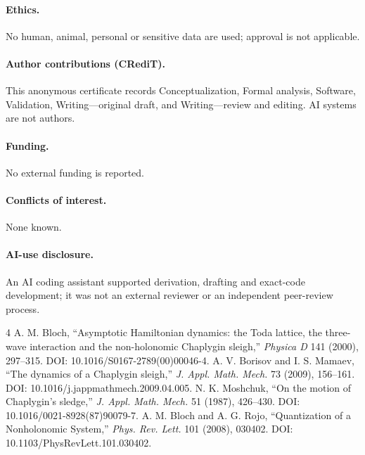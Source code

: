 \documentclass[9pt]{extarticle}
\begin{document}
\paragraph{Ethics.} No human, animal, personal or sensitive data are used;
approval is not applicable.
\paragraph{Author contributions (CRediT).} This anonymous certificate records
Conceptualization, Formal analysis, Software, Validation, Writing---original
draft, and Writing---review and editing.  AI systems are not authors.
\paragraph{Funding.} No external funding is reported.
\paragraph{Conflicts of interest.} None known.
\paragraph{AI-use disclosure.} An AI coding assistant supported derivation,
drafting and exact-code development; it was not an external reviewer or an
independent peer-review process.

\begin{thebibliography}{4}
 A. M. Bloch, ``Asymptotic Hamiltonian dynamics: the Toda
lattice, the three-wave interaction and the non-holonomic Chaplygin sleigh,''
\emph{Physica D} 141 (2000), 297--315.
DOI: 10.1016/S0167-2789(00)00046-4.
 A. V. Borisov and I. S. Mamaev, ``The dynamics of a Chaplygin
sleigh,'' \emph{J. Appl. Math. Mech.} 73 (2009), 156--161.
DOI: 10.1016/j.jappmathmech.2009.04.005.
 N. K. Moshchuk, ``On the motion of Chaplygin's sledge,''
\emph{J. Appl. Math. Mech.} 51 (1987), 426--430.
DOI: 10.1016/0021-8928(87)90079-7.
 A. M. Bloch and A. G. Rojo, ``Quantization of a Nonholonomic
System,'' \emph{Phys. Rev. Lett.} 101 (2008), 030402.
DOI: 10.1103/PhysRevLett.101.030402.
\end{thebibliography}
\end{document}
